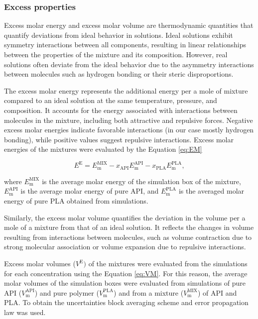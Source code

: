 \subsubsection{Excess properties}
Excess molar energy and excess molar volume are thermodynamic quantities that quantify deviations from ideal behavior in solutions. Ideal solutions exhibit symmetry interactions between all components, resulting in linear relationships between the properties of the mixture and its composition. However, real solutions often deviate from the ideal behavior due to the asymmetry interactions between molecules such as hydrogen bonding or their steric disproportions.

The excess molar energy represents the additional energy per a mole of mixture compared to an ideal solution at the same temperature, pressure, and composition. It accounts for the energy associated with interactions between molecules in the mixture, including both attractive and repulsive forces. Negative excess molar energies indicate favorable interactions (in our case mostly hydrogen bonding), while positive values suggest repulsive interactions. Excess molar energies of the mixtures were evaluated by the Equation \ref{eq:EM}

\begin{equation}\label{eq:EM}
	E^\text{E} = E_{\text{m}}^{\text{MIX}} - x_{\text{API}} E_{\text{m}}^{\text{API}} - x_{\text{PLA}} E_{\text{m}}^{\text{PLA}},
\end{equation}

where $E_{\text{m}}^{\text{MIX}}$ is the average molar energy of the simulation box of the mixture, $E_{\text{m}}^{\text{API}}$ is the average molar energy of pure API, and $E_{\text{m}}^{\text{PLA}}$ is the averaged molar energy of pure PLA obtained from simulations. 

Similarly, the excess molar volume quantifies the deviation in the volume per a mole of a mixture from that of an ideal solution. It reflects the changes in volume resulting from interactions between molecules, such as volume contraction due to strong molecular association or volume expansion due to repulsive interactions.

Excess molar volumes ($V^{\text{E}})$ of the mixtures were evaluated from the simulations for each concentration using the Equation \ref{eq:VM}. For this reason, the average molar volumes of the simulation boxes were evaluated from simulations of pure API ($V_{\text{m}}^{\text{API}} $) and pure polymer ($V_{\text{m}}^{\text{PLA}}$) and from a mixture ($V_{\text{m}}^{\text{MIX}}$) of API and PLA. To obtain the uncertainties block averaging scheme and error propagation law was used. 
 
